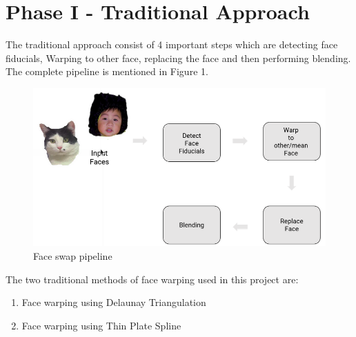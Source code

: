 \documentclass[conference]{IEEEtran}
\begin{document}
\section{Phase I - Traditional Approach}
The traditional approach consist of 4 important steps which are detecting face fiducials, Warping to other face, replacing the face and then performing blending. The complete pipeline is mentioned in Figure 1.
\begin{figure}[H]
\includegraphics[scale=0.3]{pipeline.png}
\centering
\caption{Face swap pipeline}
\end{figure}
The two traditional methods of face warping used in this project are:
\begin{enumerate}
\item Face warping using Delaunay Triangulation
\item Face warping using Thin Plate Spline
\end{enumerate}
\end{document}
